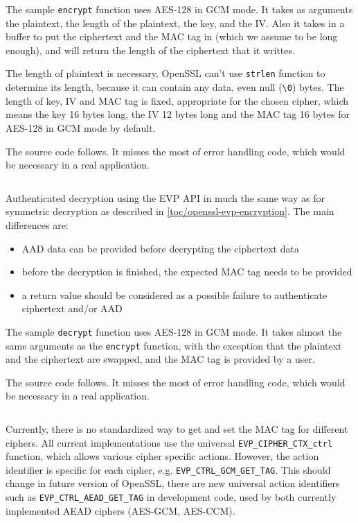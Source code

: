 The sample \texttt{encrypt} function uses AES-128 in GCM mode. It takes as arguments the plaintext, the length of the plaintext, the key, and the IV. Also it takes in a buffer to put the ciphertext and the MAC tag in (which we assume to be long enough), and will return the length of the ciphertext that it writtes.

The length of plaintext is necessary, OpenSSL can't use \texttt{strlen} function to determine its length, because it can contain any data, even null (\texttt{\textbackslash0}) bytes. The length of key, IV and MAC tag is fixed, appropriate for the chosen cipher, which means the key 16 bytes long, the IV 12 bytes long and the MAC tag 16 bytes for AES-128 in GCM mode by default.

The source code follows. It misses the most of error handling code, which would be necessary in a real application.

\inputminted{c}{code/openssl-evp-aead-encrypt.c}

Authenticated decryption using the EVP API in much the same way as for symmetric decryption as described in \autoref{toc/openssl-evp-encryption}. The main differences are:

\begin{itemize}
  \item AAD data can be provided before decrypting the ciphertext data
  \item before the decryption is finished, the expected MAC tag needs to be provided
  \item a return value should be considered as a possible failure to authenticate ciphertext and/or AAD
\end{itemize}

The sample \texttt{decrypt} function uses AES-128 in GCM mode. It takes almost the same arguments as the \texttt{encrypt} function, with the exception that the plaintext and the ciphertext are swapped, and the MAC tag is provided by a user.

The source code follows. It misses the most of error handling code, which would be necessary in a real application.

\inputminted{c}{code/openssl-evp-aead-decrypt.c}

Currently, there is no standardized way to get and set the MAC tag for different ciphers. All current implementations use the universal \texttt{EVP\_CIPHER\_CTX\_ctrl} function, which allows various cipher specific actions. However, the action identifier is specific for each cipher, e.g. \texttt{EVP\_CTRL\_GCM\_GET\_TAG}. This should change in future version of OpenSSL, there are new universal action identifiers such as \texttt{EVP\_CTRL\_AEAD\_GET\_TAG} in development code, used by both currently implemented AEAD ciphers (AES-GCM, AES-CCM).
